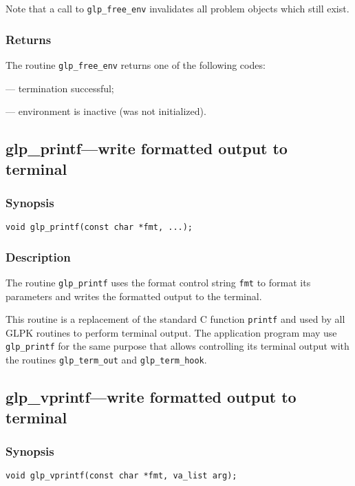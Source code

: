 Note that a call to \verb|glp_free_env| invalidates all problem objects
which still exist.

\subsubsection*{Returns}

The routine \verb|glp_free_env| returns one of the following codes:

 --- termination successful;

 --- environment is inactive (was not initialized).

\subsection{glp\_printf---write formatted output to terminal}

\subsubsection*{Synopsis}

\begin{verbatim}
void glp_printf(const char *fmt, ...);
\end{verbatim}

\subsubsection*{Description}

The routine \verb|glp_printf| uses the format control string
\verb|fmt| to format its parameters and writes the formatted output to
the terminal.

This routine is a replacement of the standard C function
\verb|printf| and used by all GLPK routines to perform terminal
output. The application program may use \verb|glp_printf| for the same
purpose that allows controlling its terminal output with the routines
\verb|glp_term_out| and \verb|glp_term_hook|.

\subsection{glp\_vprintf---write formatted output to terminal}

\subsubsection*{Synopsis}

\begin{verbatim}
void glp_vprintf(const char *fmt, va_list arg);
\end{verbatim}

